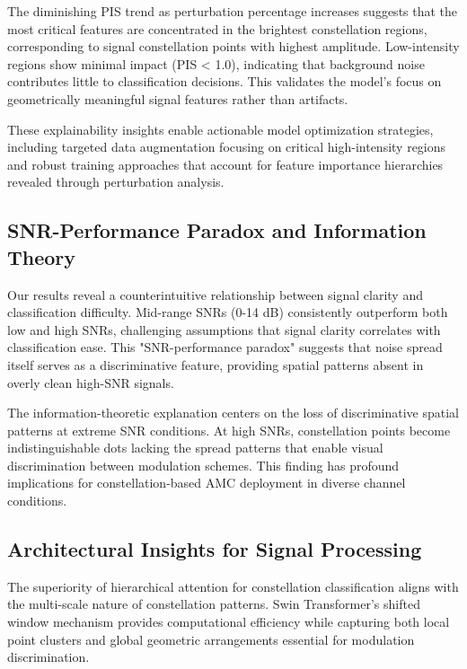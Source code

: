 \documentclass{ELSP}
\begin{document}
{{The diminishing PIS trend as perturbation percentage increases suggests that the most critical features are concentrated in the brightest constellation regions, corresponding to signal constellation points with highest amplitude. Low-intensity regions show minimal impact (PIS < 1.0), indicating that background noise contributes little to classification decisions. This validates the model's focus on geometrically meaningful signal features rather than artifacts.

These explainability insights enable actionable model optimization strategies, including targeted data augmentation focusing on critical high-intensity regions and robust training approaches that account for feature importance hierarchies revealed through perturbation analysis.

\subsection{SNR-Performance Paradox and Information Theory}

Our results reveal a counterintuitive relationship between signal clarity and classification difficulty. Mid-range SNRs (0-14 dB) consistently outperform both low and high SNRs, challenging assumptions that signal clarity correlates with classification ease. This "SNR-performance paradox" suggests that noise spread itself serves as a discriminative feature, providing spatial patterns absent in overly clean high-SNR signals.

The information-theoretic explanation centers on the loss of discriminative spatial patterns at extreme SNR conditions. At high SNRs, constellation points become indistinguishable dots lacking the spread patterns that enable visual discrimination between modulation schemes. This finding has profound implications for constellation-based AMC deployment in diverse channel conditions.

\subsection{Architectural Insights for Signal Processing}

The superiority of hierarchical attention for constellation classification aligns with the multi-scale nature of constellation patterns. Swin Transformer's shifted window mechanism provides computational efficiency while capturing both local point clusters and global geometric arrangements essential for modulation discrimination.

}}
\end{document}
